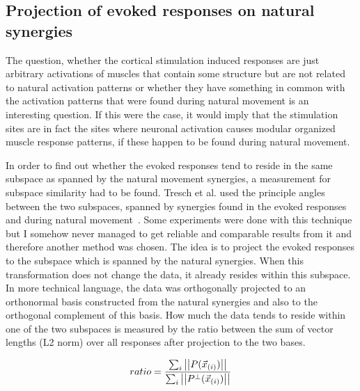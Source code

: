 

\subsection{Projection of evoked responses on natural synergies} %
\label{sg:sub:projection}

The question, whether the cortical stimulation induced responses are just arbitrary activations of muscles that contain some structure but are not related to natural activation patterns or whether they have something in common with the activation patterns that were found during natural movement is an interesting question. If this were the case, it would imply that the stimulation sites are in fact the sites where neuronal activation causes modular organized muscle response patterns, if these happen to be found during natural movement.

In order to find out whether the evoked responses tend to reside in the same subspace as spanned by the natural movement synergies, a measurement for subspace similarity had to be found. Tresch et al. used the principle angles between the two subspaces, spanned by synergies found in the evoked responses and during natural movement~\citet{Tresch:2006p3766}. Some experiments were done with this technique but I somehow never managed to get reliable and
comparable results from it and therefore another method was chosen.
The idea is to project the evoked responses to the subspace which is spanned by the natural synergies. When this transformation does not change the data, it already resides within this subspace. In more technical language, the data was orthogonally projected to an orthonormal basis constructed from the natural synergies and also to the orthogonal complement of this basis. How much the data tends to reside within one of the two subspaces is measured by the ratio between the sum of vector lengths (L2 norm) over all responses after projection to the two bases.

\begin{equation}
	ratio = \frac
		{\sum_{i} \left|\left|P(\vec{x}_{(i)})\right|\right|} 
		{\sum_{i} \left|\left|P^{\perp}(\vec{x}_{(i)})\right|\right|}
\end{equation}

